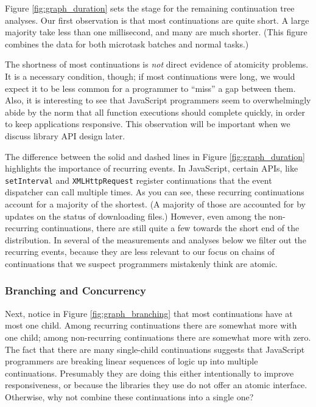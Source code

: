 \documentclass[acmsmall,anonymous,review]{acmart}\settopmatter{printfolios=true,printccs=false,printacmref=false}
\begin{document}
Figure \ref{fig:graph_duration} sets the stage for the remaining continuation tree analyses.
Our first observation is that most continuations are quite short.
A large majority take less than one millisecond, and many are much shorter.
(This figure combines the data for both microtask batches and normal tasks.)

The shortness of most continuations is \emph{not} direct evidence of atomicity problems.
It is a necessary condition, though; if most continuations were long, we would expect it to be less common for a programmer to ``miss'' a gap between them.
Also, it is interesting to see that JavaScript programmers seem to overwhelmingly abide by the norm that all function executions should complete quickly, in order to keep applications responsive.
This observation will be important when we discuss library API design later.

The difference between the solid and dashed lines in Figure \ref{fig:graph_duration} highlights the importance of recurring events.
In JavaScript, certain APIs, like \texttt{setInterval} and \texttt{XMLHttpRequest} register continuations that the event dispatcher can call multiple times.
As you can see, these recurring continuations account for a majority of the shortest.
(A majority of those are accounted for by updates on the status of downloading files.)
However, even among the non-recurring continuations, there are still quite a few towards the short end of the distribution.
In several of the measurements and analyses below we filter out the recurring events, because they are less relevant to our focus on chains of continuations that we suspect programmers mistakenly think are atomic.

\subsubsection{Branching and Concurrency}

Next, notice in Figure \ref{fig:graph_branching} that most continuations have at most one child.
Among recurring continuations there are somewhat more with one child; among non-recurring continuations there are somewhat more with zero.
The fact that there are many single-child continuations suggests that JavaScript programmers are breaking linear sequences of logic up into multiple continuations.
Presumably they are doing this either intentionally to improve responsiveness, or because the libraries they use do not offer an atomic interface.
Otherwise, why not combine these continuations into a single one?
\end{document}
